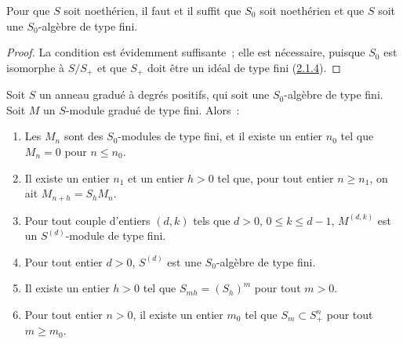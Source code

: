 \begin{corollary}[2.1.5]
\label{II.2.1.5-fr}
Pour que $S$ soit noethérien, il faut et il suffit que $S_0$ soit noethérien
et que $S$ soit une $S_0$-algèbre de type fini.
\end{corollary}

\begin{proof}
La condition est évidemment suffisante~; elle est nécessaire, puisque $S_0$
est isomorphe à $S/S_+$ et que $S_+$ doit être un idéal de type fini
(\hyperref[II.2.1.4-fr]{2.1.4}).
\end{proof}

\begin{lemma}[2.1.6]
\label{II.2.1.6-fr}
Soit $S$ un anneau gradué à degrés positifs, qui soit une $S_0$-algèbre de
type fini. Soit $M$ un $S$-module gradué de type fini. Alors~:
\begin{enumerate}
  \item[\rm(i)] Les $M_n$ sont des $S_0$-modules de type fini, et il existe
    un entier $n_0$ tel que $M_n=0$ pour $n\leq n_0$.
  \item[\rm(ii)] Il existe un entier $n_1$ et un entier $h>0$ tel que, pour
    tout entier $n\geq n_1$, on ait $M_{n+h}=S_hM_n$.
  \item[\rm(iii)] Pour tout couple d'entiers $(d,k)$ tels que $d>0$,
    $0\leq k\leq d-1$, $M^{(d,k)}$ est un $S^{(d)}$-module de type fini.
  \item[\rm(iv)] Pour tout entier $d>0$, $S^{(d)}$ est une $S_0$-algèbre de
    type fini.
  \item[\rm(v)] Il existe un entier $h>0$ tel que $S_{mh}=(S_h)^m$ pour tout
    $m>0$.
  \item[\rm(vi)] Pour tout entier $n>0$, il existe un entier $m_0$ tel que
    $S_m\subset S_+^n$ pour tout $m\geq m_0$.
\end{enumerate}
\end{lemma}

